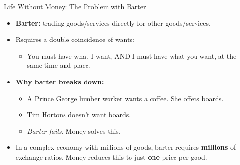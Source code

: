\documentclass[aspectratio=169]{beamer}
\begin{document}
\begin{frame}{Life Without Money: The Problem with Barter}
\transfade
\begin{itemize}[<+->]
  \item \textbf{Barter:} trading goods/services directly for other goods/services.
  \item Requires a \alert{double coincidence of wants}:
  \begin{itemize}[<+->]
    \item You must have what I want, AND I must have what you want, at the same time and place.
  \end{itemize}
  \item \textbf{Why barter breaks down:}
  \begin{itemize}[<+->]
    \item A Prince George lumber worker wants a coffee. She offers boards.
    \item Tim Hortons doesn't want boards.
    \item \textit{Barter fails.} Money solves this.
  \end{itemize}
  \item In a complex economy with millions of goods, barter requires \textbf{millions} of exchange ratios. Money reduces this to just \textbf{one} price per good.
\end{itemize}
\end{frame}
\end{document}
